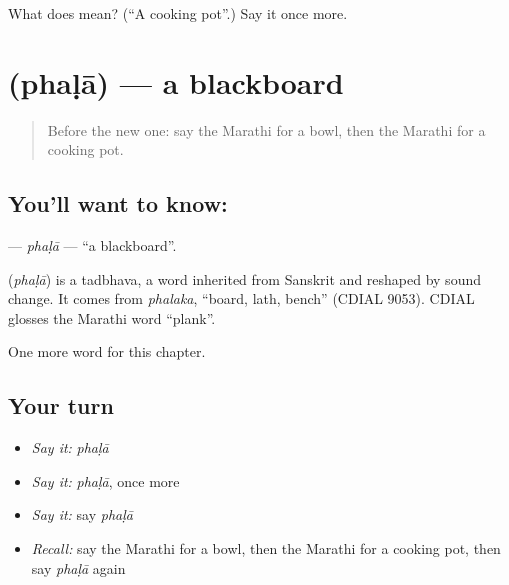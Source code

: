 \begin{tcolorbox}[breakable,colback=teal!4,colframe=teal!35!black,title={Before you move on}]
What does  mean? (\textquotedblleft{}A cooking pot\textquotedblright{}.) Say it once more.
\end{tcolorbox}
\section[\texorpdfstring{\mr{फळा} (phaḷā)}{फळा (phaḷā)}]{ (phaḷā) — a blackboard}

\label{lesson:MR-C134-phala}



\begin{quote}
Before the new one: say the Marathi for a bowl, then the Marathi for a cooking pot.
\end{quote}

\subsection*{You'll want to know: }
\textbf{} — \emph{phaḷā} — \textquotedblleft{}a blackboard\textquotedblright{}.

\begin{cousinweb}
\textbf{} (\emph{phaḷā}) is a tadbhava, a word inherited from Sanskrit and reshaped by sound change. It comes from \emph{phalaka}, \textquotedblleft{}board, lath, bench\textquotedblright{} (CDIAL 9053). CDIAL glosses the Marathi word \textquotedblleft{}plank\textquotedblright{}.
\end{cousinweb}

\begin{grammarlens}[title={What you've built}]
One more word for this chapter.
\end{grammarlens}

\subsection*{Your turn}
\begin{itemize}
\raggedright
  \item \emph{Say it:} \emph{phaḷā}
  \item \emph{Say it:} \emph{phaḷā}, once more
  \item \emph{Say it:} say \emph{phaḷā}
  \item \emph{Recall:} say the Marathi for a bowl, then the Marathi for a cooking pot, then say \emph{phaḷā} again
\end{itemize}

